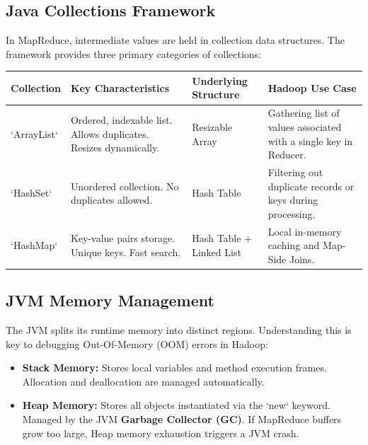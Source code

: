 \documentclass[12pt,a4paper]{article}
\renewcommand{\arraystretch}{1.45}
\begin{document}
\subsection{Java Collections Framework}
In MapReduce, intermediate values are held in collection data structures. The framework provides three primary categories of collections:

\par\vspace{6pt}\noindent
{\renewcommand{\arraystretch}{1.4}%
\begin{tabularx}{\linewidth}{|B{3.0cm}|Y|B{3.2cm}|Y|}
\hline
\textbf{Collection} & \textbf{Key Characteristics} & \textbf{Underlying Structure} & \textbf{Hadoop Use Case} \\
\hline
`ArrayList` & Ordered, indexable list. Allows duplicates. Resizes dynamically. & Resizable Array & Gathering list of values associated with a single key in Reducer. \\
\hline
`HashSet` & Unordered collection. No duplicates allowed. & Hash Table & Filtering out duplicate records or keys during processing. \\
\hline
`HashMap` & Key-value pairs storage. Unique keys. Fast search. & Hash Table + Linked List & Local in-memory caching and Map-Side Joins. \\
\hline
\end{tabularx}}

\subsection{JVM Memory Management}
The JVM splits its runtime memory into distinct regions. Understanding this is key to debugging Out-Of-Memory (OOM) errors in Hadoop:
\begin{itemize}[leftmargin=*, itemsep=3pt]
  \item \textbf{Stack Memory:} Stores local variables and method execution frames. Allocation and deallocation are managed automatically.
  \item \textbf{Heap Memory:} Stores all objects instantiated via the `new` keyword. Managed by the JVM \textbf{Garbage Collector (GC)}. If MapReduce buffers grow too large, Heap memory exhaustion triggers a JVM crash.
\end{itemize}
\end{document}
